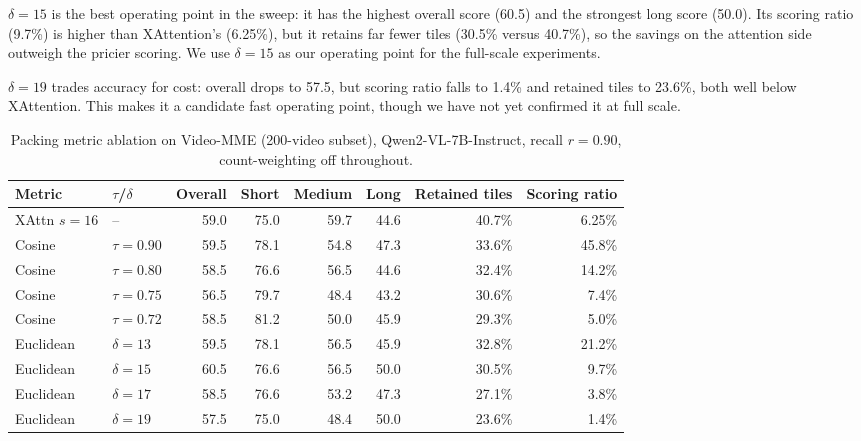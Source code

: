$\delta{=}15$ is the best operating point in the sweep: it has the highest overall score (60.5) and the strongest long score (50.0). Its scoring ratio (9.7\%) is higher than XAttention's (6.25\%), but it retains far fewer tiles (30.5\% versus 40.7\%), so the savings on the attention side outweigh the pricier scoring. We use $\delta{=}15$ as our operating point for the full-scale experiments.

$\delta{=}19$ trades accuracy for cost: overall drops to 57.5, but scoring ratio falls to 1.4\% and retained tiles to 23.6\%, both well below XAttention. This makes it a candidate fast operating point, though we have not yet confirmed it at full scale.




\begin{table}[!ht]
\centering
\caption{Packing metric ablation on Video-MME (200-video subset), Qwen2-VL-7B-Instruct, recall $r{=}0.90$, count-weighting off throughout.}
\label{tab:videomme_ablation_metric}
\begin{tabular}{llrrrrrr}
\toprule
Metric & $\tau$/$\delta$ & Overall & Short & Medium & Long & Retained tiles & Scoring ratio \\
\midrule
XAttn $s{=}16$ & -- & 59.0 & 75.0 & 59.7 & 44.6 & 40.7\% & 6.25\% \\
\midrule
Cosine & $\tau{=}0.90$ & 59.5 & 78.1 & 54.8 & 47.3 & 33.6\% & 45.8\% \\
Cosine & $\tau{=}0.80$ & 58.5 & 76.6 & 56.5 & 44.6 & 32.4\% & 14.2\% \\
Cosine & $\tau{=}0.75$ & 56.5 & 79.7 & 48.4 & 43.2 & 30.6\% & 7.4\% \\
Cosine & $\tau{=}0.72$ & 58.5 & 81.2 & 50.0 & 45.9 & 29.3\% & 5.0\% \\
\midrule
Euclidean & $\delta{=}13$ & 59.5 & 78.1 & 56.5 & 45.9 & 32.8\% & 21.2\% \\
Euclidean & $\delta{=}15$ & 60.5 & 76.6 & 56.5 & 50.0 & 30.5\% & 9.7\% \\
Euclidean & $\delta{=}17$ & 58.5 & 76.6 & 53.2 & 47.3 & 27.1\% & 3.8\% \\
Euclidean & $\delta{=}19$ & 57.5 & 75.0 & 48.4 & 50.0 & 23.6\% & 1.4\% \\
\bottomrule
\end{tabular}
\end{table}
